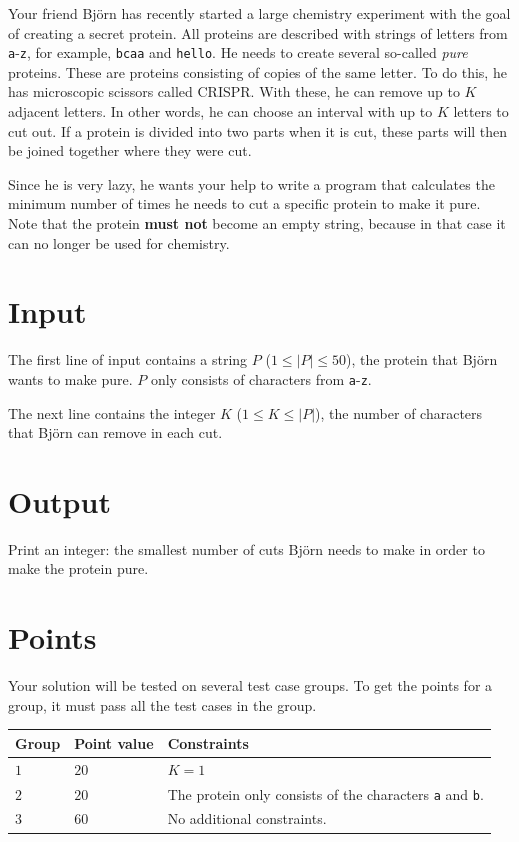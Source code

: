 \noindent

Your friend Björn has recently started a large chemistry experiment with the
goal of creating a secret protein. All proteins are described with strings
of letters from \texttt{a}-\texttt{z}, for example, \texttt{bcaa} and
\texttt{hello}. He needs to create several so-called \textit{pure} proteins.
These are proteins consisting of copies of the same letter. To do this, he has
microscopic scissors called CRISPR. With these, he can remove up to $K$
adjacent letters. In other words, he can choose an interval with up to $K$
letters to cut out. If a protein is divided into two parts when it is cut,
these parts will then be joined together where they were cut.

Since he is very lazy, he wants your help to write a program that calculates
the minimum number of times he needs to cut a specific protein to make it pure.
Note that the protein \textbf{must not} become an empty string, because in that
case it can no longer be used for chemistry.

\section*{Input}
The first line of input contains a string $P$ ($1 \leq |P| \leq 50$), the protein
that Björn wants to make pure. $P$ only consists of characters from \texttt{a}-\texttt{z}.

The next line contains the integer $K$ ($1 \leq K \leq |P|$), the number of characters
that Björn can remove in each cut.

\section*{Output}
Print an integer: the smallest number of cuts Björn needs to make in order to make the protein pure.

\section*{Points}
Your solution will be tested on several test case groups.
To get the points for a group, it must pass all the test cases in the group.

\noindent
\begin{tabular}{| l | l | p{12cm} |}
  \hline
  \textbf{Group} & \textbf{Point value} & \textbf{Constraints} \\ \hline
  $1$    & $20$       & $K=1$ \\ \hline
  $2$    & $20$       & The protein only consists of the characters \texttt{a} and \texttt{b}. \\ \hline
  $3$    & $60$       & No additional constraints. \\ \hline
\end{tabular}

